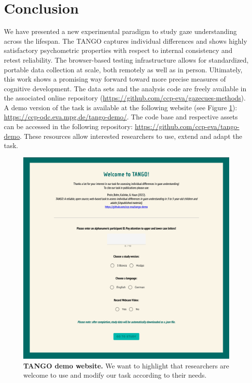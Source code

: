 \documentclass[
  man,floatsintext]{apa6}
\begin{document}
\hypertarget{conclusion}{%
\section{Conclusion}\label{conclusion}}

We have presented a new experimental paradigm to study gaze understanding across the lifespan.
The TANGO captures individual differences and shows highly satisfactory psychometric properties with respect to internal consistency and retest reliability.
The browser-based testing infrastructure allows for standardized, portable data collection at scale, both remotely as well as in person.
Ultimately, this work shows a promising way forward toward more precise measures of cognitive development.
The data sets and the analysis code are freely available in the associated online repository (\url{https://github.com/ccp-eva/gazecues-methods}).
A demo version of the task is available at the following website (see Figure \ref{fig:fig4}): \url{https://ccp-odc.eva.mpg.de/tango-demo/}.
The code base and respective assets can be accessed in the following repository: \url{https://github.com/ccp-eva/tango-demo}.
These resources allow interested researchers to use, extend and adapt the task.



\begin{figure}

{\centering \includegraphics[width=1\linewidth]{../figures/tango_demo_screenshot} 

}

\caption{\textbf{TANGO demo website.} We want to highlight that researchers are welcome to use and modify our task according to their needs.}\label{fig:fig4}
\end{figure}
\end{document}

